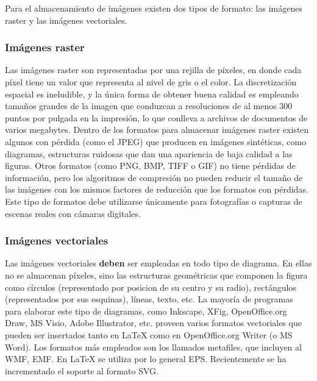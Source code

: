 
Para el almacenamiento de imágenes existen dos tipos de formato: las imágenes
raster y las imágenes vectoriales.

\subsubsection{Imágenes raster}

Las imágenes raster son representadas por una rejilla de píxeles, en donde cada
píxel tiene un valor que representa al nivel de gris o el color. La
discretización espacial es ineludible, y la única forma de obtener buena
calidad es empleando tamaños grandes de la imagen que conduzcan a resoluciones
de al menos 300 puntos por pulgada en la impresión, lo que conlleva a archivos
de documentos de varios megabytes. Dentro de los formatos para almacenar
imágenes raster existen algunos con pérdida (como el JPEG) que producen en
imágenes sintéticas, como diagramas, estructuras ruidosas que dan una
apariencia de baja calidad a las figuras. Otros formatos (como PNG, BMP, TIFF o
GIF) no tiene pérdidas de información, pero los algoritmos de compresión no
pueden reducir el tamaño de las imágenes con los mismos factores de reducción
que los formatos con pérdidas. Este tipo de formatos debe utilizarse únicamente
para fotografías o capturas de escenas reales con cámaras digitales.

\subsubsection{Imágenes vectoriales}

Las imágenes vectoriales \textbf{deben} ser empleadas en todo tipo de
diagrama. En ellas no se almacenan píxeles, sino las estructuras geométricas
que componen la figura como círculos (representado por posicion de su centro y
su radio), rectángulos (representados por sus esquinas), líneas, texto, etc. La
mayoría de programas para elaborar este tipo de diagramas, como Inkscape, XFig,
OpenOffice.org Draw, MS Visio, Adobe Illustrator, etc. proveen varios formatos
vectoriales que pueden ser insertados tanto en LaTeX como en OpenOffice.org
Writer (o MS Word). Los formatos más empleados son los llamados metafiles, que
incluyen al WMF, EMF. En LaTeX se utiliza por lo general EPS. Recientemente se
ha incrementado el soporte al formato SVG.

